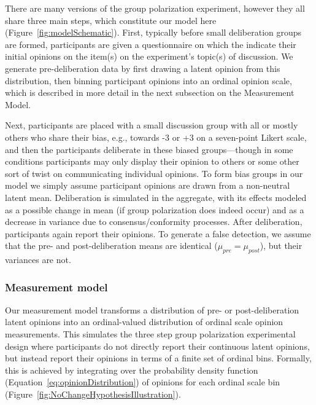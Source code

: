 There are many versions of the group polarization experiment, however they all
share three main steps, which constitute our model here~\cite[p. 143]{Turner1987Book}
(Figure~\ref{fig:modelSchematic}).
First, typically before small deliberation groups are formed, participants
are given a questionnaire on which the indicate their initial opinions on the
item(s) on the experiment's topic(s) of discussion. 
We generate pre-deliberation
data by first drawing a latent opinion from this distribution, then 
binning participant opinions into an ordinal opinion scale, which is 
described in more detail in the next subsection on the Measurement Model.

Next, participants are placed with a small discussion group with all
or mostly others who share their bias, e.g., towards -3 or +3 on a seven-point
Likert scale, and then the participants deliberate in these biased 
groups---though in some conditions
participants may only display their opinion to others or some other sort of
twist on communicating individual opinions.
To form bias groups in our model
we simply assume participant opinions are drawn from a non-neutral latent mean.
Deliberation is simulated in the aggregate, with its effects modeled as a possible change
in mean (if group polarization does indeed occur) and as a decrease in variance
due to consensus/conformity processes.
After deliberation, participants again report their opinions. 
To generate a false detection, we assume that the pre- and post-deliberation
means are identical ($\mu_{pre} = \mu_{post}$), but their variances are not. 


\subsubsection{Measurement model}



Our measurement model transforms a distribution of
pre- or post-deliberation latent opinions into an ordinal-valued
distribution of ordinal scale opinion measurements. 
This simulates the three step group polarization experimental design where
participants do not directly report their continuous latent opinions, but instead 
report their opinions in terms of a finite set of ordinal bins.
Formally, this is achieved by integrating over the probability density function
(Equation~\ref{eq:opinionDistribution}) of opinions for each ordinal scale 
bin (Figure~\ref{fig:NoChangeHypothesisIllustration}). 

